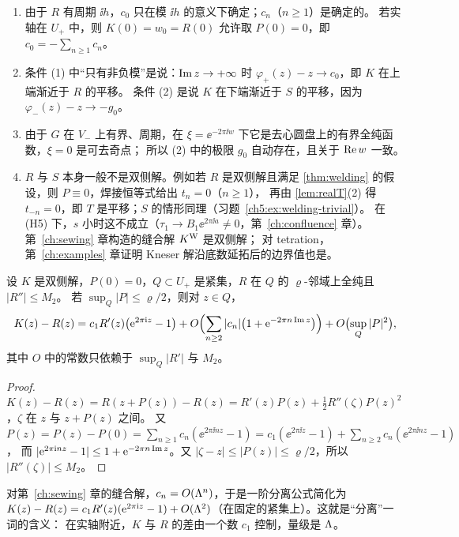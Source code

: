 \begin{remark}\label{ch5:rem:two-sided}
\begin{enumerate}
\item 由于 $R$ 有周期 $\ii h$，$c_0$ 只在模 $\ii h$ 的意义下确定；$c_n$（$n\ge1$）是确定的。
  若实轴在 $U_+$ 中，则 $K(0)=w_0=R(0)$ 允许取 $P(0)=0$，即 $c_0=-\sum_{n\ge1}c_n$。
\item 条件 (1) 中``只有非负模''是说：$\operatorname{Im} z\to+\infty$ 时 $\varphi_+(z)-z\to c_0$，即 $K$ 在上端渐近于 $R$ 的平移。
  条件 (2) 是说 $K$ 在下端渐近于 $S$ 的平移，因为 $\varphi_-(z)-z\to-g_0$。
\item 由于 $G$ 在 $V_-$ 上有界、周期，在 $\xi=\ee^{-2\pi\ii w}$ 下它是去心圆盘上的有界全纯函数，$\xi=0$ 是可去奇点；
  所以 (2) 中的极限 $g_0$ 自动存在，且关于 $\operatorname{Re} w$ 一致。
\item $R$ 与 $S$ 本身一般不是双侧解。例如若 $R$ 是双侧解且满足 \cref{thm:welding} 的假设，则 $P\equiv0$，焊接恒等式给出 $t_n=0$（$n\ge1$），
  再由 \cref{lem:realT}(2) 得 $t_{-n}=0$，即 $T$ 是平移；$S$ 的情形同理（习题~\ref{ch5:ex:welding-trivial}）。
  在 (H5) 下，$s$ 小时这不成立（$\tau_1\to B_1\ee^{2\pi\ii a}\ne0$，第~\ref{ch:confluence} 章）。第~\ref{ch:sewing} 章构造的缝合解 $K^{\mathrm W}$ 是双侧解；
  对 tetration，第~\ref{ch:examples} 章证明 Kneser 解沿底数延拓后的边界值也是。
\end{enumerate}
\end{remark}

\begin{proposition}[一阶分离公式]\label{ch5:prop:first-sep}
设 $K$ 是双侧解，$P(0)=0$，$Q\subset U_+$ 是紧集，$R$ 在 $Q$ 的 $\varrho$-邻域上全纯且 $|R''|\le M_2$。
若 $\sup_Q|P|\le\varrho/2$，则对 $z\in Q$，
\[
 K(z)-R(z)=c_1R'(z)\bigl(\mathrm{e}^{2\pi\mathrm{i} z}-1\bigr)+O\Bigl(\sum_{n\ge2}|c_n|\bigl(1+\mathrm{e}^{-2\pi n\operatorname{Im} z}\bigr)\Bigr)+O\bigl(\sup_Q|P|^2\bigr),
\]
其中 $O$ 中的常数只依赖于 $\sup_Q|R'|$ 与 $M_2$。
\end{proposition}

\begin{proof}
$K(z)-R(z)=R(z+P(z))-R(z)=R'(z)P(z)+\frac12R''(\zeta)P(z)^2$，$\zeta$ 在 $z$ 与 $z+P(z)$ 之间。
又 $P(z)=P(z)-P(0)=\sum_{n\ge1}c_n(\ee^{2\pi\ii nz}-1)=c_1(\ee^{2\pi\ii z}-1)+\sum_{n\ge2}c_n(\ee^{2\pi\ii nz}-1)$，
而 $|\mathrm{e}^{2\pi\mathrm{i} nz}-1|\le1+\mathrm{e}^{-2\pi n\operatorname{Im} z}$。又 $|\zeta-z|\le|P(z)|\le\varrho/2$，所以 $|R''(\zeta)|\le M_2$。
\end{proof}

对第~\ref{ch:sewing} 章的缝合解，$c_n=O(\Lambda^n)$，于是一阶分离公式简化为
$K(z)-R(z)=c_1R'(z)(\mathrm{e}^{2\pi\mathrm{i} z}-1)+O(\Lambda^2)$（在固定的紧集上）。这就是``分离''一词的含义：
在实轴附近，$K$ 与 $R$ 的差由一个数 $c_1$ 控制，量级是 $\Lambda$。

